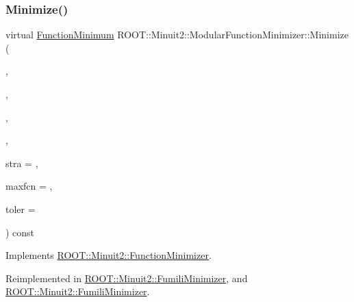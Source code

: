 \subsubsection{\texorpdfstring{Minimize()}{Minimize()}\hspace{0.1cm}{\footnotesize\ttfamily [5/22]}}
{\footnotesize\ttfamily virtual \mbox{\hyperlink{classROOT_1_1Minuit2_1_1FunctionMinimum}{Function\+Minimum}} R\+O\+O\+T\+::\+Minuit2\+::\+Modular\+Function\+Minimizer\+::\+Minimize (\begin{DoxyParamCaption}\item[{const \mbox{\hyperlink{classROOT_1_1Minuit2_1_1FCNBase}{F\+C\+N\+Base}} \&}]{,  }\item[{const std\+::vector$<$ double $>$ \&}]{,  }\item[{unsigned int}]{,  }\item[{const std\+::vector$<$ double $>$ \&}]{,  }\item[{unsigned int}]{stra = {},  }\item[{unsigned int}]{maxfcn = {},  }\item[{double}]{toler = {} }\end{DoxyParamCaption}) const\hspace{0.3cm}{\ttfamily [virtual]}}



Implements \mbox{\hyperlink{classROOT_1_1Minuit2_1_1FunctionMinimizer_a22d44dc8c018424a98ce8928ee7c5613}{R\+O\+O\+T\+::\+Minuit2\+::\+Function\+Minimizer}}.



Reimplemented in \mbox{\hyperlink{classROOT_1_1Minuit2_1_1FumiliMinimizer_ac2cff69bc8ac1702179b9e17288095a8}{R\+O\+O\+T\+::\+Minuit2\+::\+Fumili\+Minimizer}}, and \mbox{\hyperlink{classROOT_1_1Minuit2_1_1FumiliMinimizer_ac2cff69bc8ac1702179b9e17288095a8}{R\+O\+O\+T\+::\+Minuit2\+::\+Fumili\+Minimizer}}.

\mbox{\label{classROOT_1_1Minuit2_1_1ModularFunctionMinimizer_a83b8641b6e3662f763c79c3fcb014838}} 
